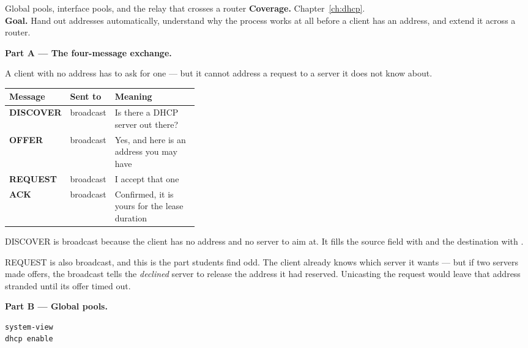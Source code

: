 
\begin{labproject}{Global pools, interface pools, and the relay that crosses a router}
\textbf{Coverage.} Chapter~\ref{ch:dhcp}.\\
\textbf{Goal.} Hand out addresses automatically, understand why the process works at all before a client has an address, and extend it across a router.

\medskip\noindent\textbf{Part A --- The four-message exchange.}\par
A client with no address has to ask for one --- but it cannot address a request to a server it does not know about.

\begin{mltable}
\begin{tabularx}{\linewidth}{@{}>{\bfseries}p{0.16\linewidth}>{\ttfamily}p{0.20\linewidth}X@{}}
\toprule
\rowcolor{MLPaleBlue!92}
Message & \textrm{\bfseries Sent to} & \bfseries Meaning \\
\midrule
DISCOVER & broadcast & Is there a DHCP server out there? \\
OFFER & broadcast & Yes, and here is an address you may have \\
REQUEST & broadcast & I accept that one \\
ACK & broadcast & Confirmed, it is yours for the lease duration \\
\bottomrule
\end{tabularx}
\end{mltable}

\begin{keyidea}
DISCOVER is broadcast because the client has no address and no server to aim at. It fills the source field with  and the destination with .

REQUEST is also broadcast, and this is the part students find odd. The client already knows which server it wants --- but if two servers made offers, the broadcast tells the \emph{declined} server to release the address it had reserved. Unicasting the request would leave that address stranded until its offer timed out.
\end{keyidea}

\medskip\noindent\textbf{Part B --- Global pools.}\par

\begin{lstlisting}[style=dcnterminal]
system-view
dhcp enable


\end{lstlisting}
\end{labproject}
